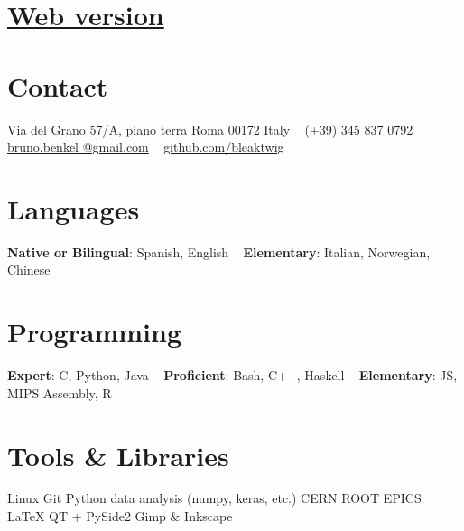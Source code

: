 \documentclass[a4paper]{cv-style}
\begin{document}
\lastupdated

\begin{aside}
    \section{\href{https://bleaktwig.github.io/cv/}{Web version}}
    \section{Contact}
        Via del Grano 57/A, piano terra
        Roma 00172
        Italy
        ~
        (+39) 345 837 0792
        ~
        \href{mailto:bruno.benkel@gmail.com}{bruno.benkel
        @gmail.com}
        ~
        \href{https://github.com/bleaktwig}{github.com/bleaktwig}
    \section{Languages}
        \textbf{Native or Bilingual}:
        Spanish, English
        ~
        \textbf{Elementary}:
        Italian, Norwegian, Chinese
    \section{Programming}
        \textbf{Expert}:
        C, Python, Java
        ~
        \textbf{Proficient}:
        Bash, C++, Haskell
        ~
        \textbf{Elementary}:
        JS, MIPS Assembly, R
    \section{Tools \& Libraries}
        Linux
        Git
        Python data analysis (numpy, keras, etc.)
        CERN ROOT
        EPICS
        \LaTeX{}
        QT + PySide2
        Gimp \& Inkscape
\end{aside}

\end{document}
